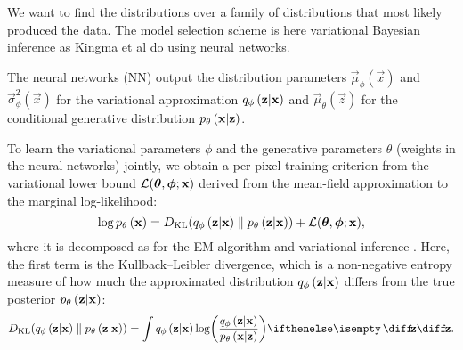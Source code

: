 We want to find the distributions over a family of distributions that most likely produced the data. The model selection scheme is here variational Bayesian inference as Kingma et al \cite{Kingma2013} do using neural networks.  
 
The neural networks (NN) output the distribution parameters $\vec{\mu}_\phi(\vec{x})$ and $\vec{\sigma}^2_\phi(\vec{x})$ for the variational approximation $q_{\phi}\left(\bm{\mathrm{z}}|\bm{\mathrm{x}}\right)$ and $\vec{\mu}_\theta(\vec{z})$ for the conditional generative distribution $p_{\theta}\left(\bm{\mathrm{x}}|\bm{\mathrm{z}}\right)$.

To learn the variational parameters $\phi$ and the generative parameters $\theta$ (weights in the neural networks) jointly, we obtain a per-pixel training criterion from the variational lower bound $\mathcal{L}(\bm{\mathrm{\theta}},\bm{\mathrm{\phi}};\bm{\mathrm{x}})$ derived from the mean-field approximation to the marginal log-likelihood:
\begin{equation}
	\log p_{\theta}\left(\bm{\mathrm{x}}\right) = D_{\text{KL}}( q_{\phi}\left(\bm{\mathrm{z}}|\bm{\mathrm{x}}\right) \parallel p_{\theta}\left(\bm{\mathrm{z}}|\bm{\mathrm{x}}\right)) + \mathcal{L}(\bm{\mathrm{\theta}},\bm{\mathrm{\phi}};\bm{\mathrm{x}}) ,
\end{equation} 
where it is decomposed as for the EM-algorithm and variational inference \cite[\S10.2]{Bishop2006}. Here, the first term is the Kullback--Leibler divergence, which is a non-negative entropy measure of how much the approximated distribution $q_{\phi}\left(\bm{\mathrm{z}}|\bm{\mathrm{x}}\right)$ differs from the true posterior $p_{\theta}\left(\bm{\mathrm{z}}|\bm{\mathrm{x}}\right)$:
\begin{equation}
    D\idx{KL}\parens{ \enc{\vec{z}|\vec{x}} \parallel \dec{\vec{z}|\vec{x}}} = \int  \enc{\vec{z}|\vec{x}} \log \parens*{ \frac{\enc{\vec{z}|\vec{x}}}{\dec{\vec{x}|\vec{z}}} } \D{\vec{z}} .
\end{equation}


